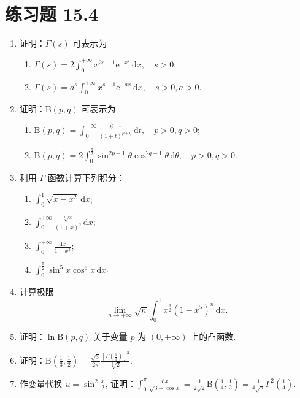 \section*{练习题 15.4}
\begin{enumerate}
  \item 证明：$\Gamma(s)$ 可表示为
  \begin{enumerate}
    \item $\displaystyle\Gamma(s)=2\int_{0}^{+\infty}x^{2s-1}\mathrm{e}^{-x^{2}}\,\mathrm{d}x,\quad s>0$;
    \item $\displaystyle\Gamma(s)=a^{s}\int_{0}^{+\infty}x^{s-1}\mathrm{e}^{-ax}\,\mathrm{d}x,\quad s>0, a>0$.
  \end{enumerate}
  \item 证明：$\mathrm{B}(p,q)$ 可表示为
  \begin{enumerate}
    \item $\displaystyle\mathrm{B}(p,q)=\int_{0}^{+\infty}\frac{t^{q-1}}{(1+t)^{p+q}}\,\mathrm{d}t,\quad p>0, q>0$;
    \item $\displaystyle\mathrm{B}(p,q)=2\int_{0}^{\frac{\pi}{2}}\sin^{2p-1}\theta\cos^{2q-1}\theta\,\mathrm{d}\theta,\quad p>0, q>0$.
  \end{enumerate}
  \item 利用 $\Gamma$ 函数计算下列积分：
  \begin{enumerate}
    \item $\displaystyle\int_{0}^{1}\sqrt{x-x^{2}}\,\mathrm{d}x$;
    \item $\displaystyle\int_{0}^{+\infty}\frac{\sqrt[4]{x}}{(1+x)^{2}}\,\mathrm{d}x$;
    \item $\displaystyle\int_{0}^{+\infty}\frac{\mathrm{d}x}{1+x^{3}}$;
    \item $\displaystyle\int_{0}^{\frac{\pi}{2}}\sin^{5}x\cos^{6}x\,\mathrm{d}x$.
  \end{enumerate}
  \item 计算极限
  \[
    \lim_{n\to+\infty}\sqrt{n}\int_{0}^{1}x^{\frac{3}{2}}(1-x^{5})^{n}\,\mathrm{d}x.
\]
  \item 证明：$\ln\mathrm{B}(p,q)$ 关于变量 $p$ 为 $(0,+\infty)$ 上的凸函数.
  \item 证明：$\displaystyle\mathrm{B}\left(\frac{1}{3},\frac{1}{2}\right)=\frac{\sqrt{3}}{2\pi}\frac{\left[\Gamma\left(\frac{1}{3}\right)\right]^{3}}{\sqrt[3]{2}}$.
  \item 作变量代换 $u=\sin^{2}\frac{x}{2}$, 证明：$\displaystyle\int_{0}^{\pi}\frac{\mathrm{d}x}{\sqrt{3-\cos x}}=\frac{1}{2\sqrt{2}}\mathrm{B}\left(\frac{1}{4},\frac{1}{2}\right)=\frac{1}{4\sqrt{\pi}}\Gamma^{2}\left(\frac{1}{4}\right)$.
\end{enumerate}

